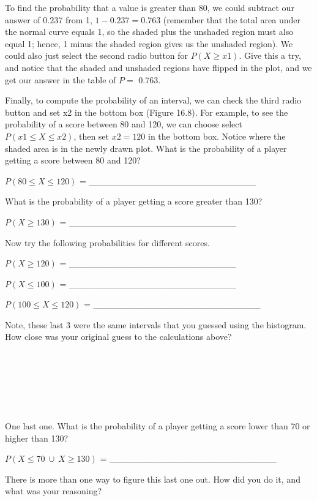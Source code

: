 \documentclass[
]{scrbook}
\begin{document}
To find the probability that a value is greater than 80, we could subtract our answer of 0.237 from 1, \(1 - 0.237 = 0.763\) (remember that the total area under the normal curve equals 1, so the shaded plus the unshaded region must also equal 1; hence, 1 minus the shaded region gives us the unshaded region).
We could also just select the second radio button for \(P(X \geq x1)\).
Give this a try, and notice that the shaded and unshaded regions have flipped in the plot, and we get our answer in the table of \(P =\) 0.763.

Finally, to compute the probability of an interval, we can check the third radio button and set x2 in the bottom box (Figure 16.8).
For example, to see the probability of a score between 80 and 120, we can choose select \(P(x1 \leq X \leq x2)\), then set \(x2 = 120\) in the bottom box.
Notice where the shaded area is in the newly drawn plot.
What is the probability of a player getting a score between 80 and 120?

\(P(80 \leq X \leq 120)\) = \_\_\_\_\_\_\_\_\_\_\_\_\_\_\_\_\_\_\_\_\_\_\_\_\_\_

What is the probability of a player getting a score greater than 130?

\(P(X \geq 130)\) = \_\_\_\_\_\_\_\_\_\_\_\_\_\_\_\_\_\_\_\_\_\_\_\_\_\_

Now try the following probabilities for different scores.

\(P(X \geq 120)\) = \_\_\_\_\_\_\_\_\_\_\_\_\_\_\_\_\_\_\_\_\_\_\_\_\_\_

\(P(X \leq 100)\) = \_\_\_\_\_\_\_\_\_\_\_\_\_\_\_\_\_\_\_\_\_\_\_\_\_\_

\(P(100 \leq X \leq 120)\) = \_\_\_\_\_\_\_\_\_\_\_\_\_\_\_\_\_\_\_\_\_\_\_\_\_\_

Note, these last 3 were the same intervals that you guessed using the histogram.
How close was your original guess to the calculations above?

\begin{verbatim}






\end{verbatim}

One last one.
What is the probability of a player getting a score lower than 70 or higher than 130?

\(P(X \leq 70 \: \cup \: X \geq 130)\) = \_\_\_\_\_\_\_\_\_\_\_\_\_\_\_\_\_\_\_\_\_\_\_\_\_\_

There is more than one way to figure this last one out.
How did you do it, and what was your reasoning?
\end{document}
